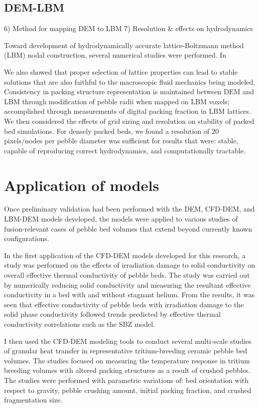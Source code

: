 \subsection{DEM-LBM}
6) Method for mapping DEM to LBM
7) Resolution \& effects on hydrodynamics

Toward development of hydrodynamically accurate lattice-Boltzmann method (LBM) nodal construction, several numerical studies were performed. In



We also showed that proper selection of lattice properties can lead to stable solutions that are also faithful to the macroscopic fluid mechanics being modeled. Consistency in packing structure representation is maintained between DEM and LBM through modification of pebble radii when mapped on LBM voxels; accomplished through measurements of digital packing fraction in LBM lattices. We then considered the effects of grid sizing and resolution on stability of packed bed simulations. For densely packed beds, we found a resolution of 20 pixels/nodes per pebble diameter was sufficient for results that were: stable, capable of reproducing correct hydrodynamics, and computationally tractable.

\section{Application of models}
Once preliminary validation had been performed with the DEM, CFD-DEM, and LBM-DEM models developed, the models were applied to various studies of fusion-relevant cases of pebble bed volumes that extend beyond currently known configurations.

In the first application of the CFD-DEM models developed for this research, a study was performed on the effects of irradiation damage to solid conductivity on overall effective thermal conductivity of pebble beds. The study was carried out by numerically reducing solid conductivity and measuring the resultant effective conductivity in a bed with and without stagnant helium. From the results, it was seen that effective conductivity of pebble beds with irradiation damage to the solid phase conductivity followed trends predicted by effective thermal conductivity correlations such as the SBZ model.

I then used the CFD-DEM modeling tools to conduct several multi-scale studies of granular heat transfer in representative tritium-breeding ceramic pebble bed volumes. The studies focused on measuring the temperature response in tritium breeding volumes with altered packing structures as a result of crushed pebbles. The studies were performed with parametric variations of: bed orientation with respect to gravity, pebble crushing amount, initial packing fraction, and crushed fragmentation size.

